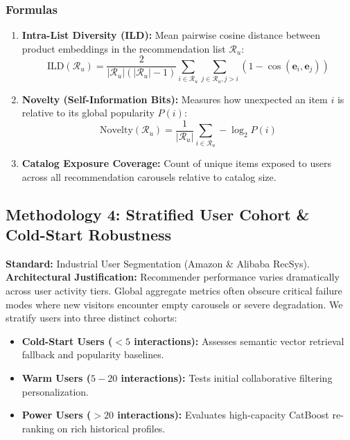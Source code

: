 \documentclass[11pt,a4paper]{article}
\begin{document}
\subsubsection{Formulas}
\begin{enumerate}
    \item \textbf{Intra-List Diversity (ILD):}
    Mean pairwise cosine distance between product embeddings in the recommendation list $\mathcal{R}_u$:
    \begin{equation}
        \text{ILD}(\mathcal{R}_u) = \frac{2}{|\mathcal{R}_u|(|\mathcal{R}_u| - 1)} \sum_{i \in \mathcal{R}_u} \sum_{j \in \mathcal{R}_u, j > i} \left( 1 - \cos(\mathbf{e}_i, \mathbf{e}_j) \right)
    \end{equation}
    \item \textbf{Novelty (Self-Information Bits):}
    Measures how unexpected an item $i$ is relative to its global popularity $P(i)$:
    \begin{equation}
        \text{Novelty}(\mathcal{R}_u) = \frac{1}{|\mathcal{R}_u|} \sum_{i \in \mathcal{R}_u} -\log_2 P(i)
    \end{equation}
    \item \textbf{Catalog Exposure Coverage:}
    Count of unique items exposed to users across all recommendation carousels relative to catalog size.
\end{enumerate}

\subsection{Methodology 4: Stratified User Cohort \& Cold-Start Robustness}
\textbf{Standard:} Industrial User Segmentation (Amazon \& Alibaba RecSys).\\
\textbf{Architectural Justification:} Recommender performance varies dramatically across user activity tiers. Global aggregate metrics often obscure critical failure modes where new visitors encounter empty carousels or severe degradation. We stratify users into three distinct cohorts:
\begin{itemize}
    \item \textbf{Cold-Start Users ($< 5$ interactions):} Assesses semantic vector retrieval fallback and popularity baselines.
    \item \textbf{Warm Users ($5 - 20$ interactions):} Tests initial collaborative filtering personalization.
    \item \textbf{Power Users ($> 20$ interactions):} Evaluates high-capacity CatBoost re-ranking on rich historical profiles.
\end{itemize}
\end{document}
